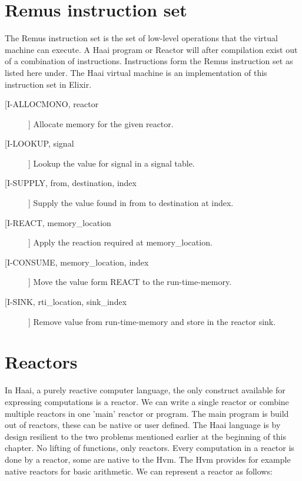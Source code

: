 \documentclass[a4paper]{book}
\begin{document}
\section{Remus instruction set}
The Remus instruction set is the set of low-level operations that the virtual machine can execute. A Haai program or Reactor will after compilation exist out of a combination of instructions. Instructions form the Remus instruction set as listed here under. The Haai virtual machine is an implementation of this instruction set in Elixir. 


\begin{description}
	\item[[I-ALLOCMONO, reactor]] Allocate memory for the given reactor.
	\item[[I-LOOKUP, signal]] Lookup the value for signal in a signal table.
	\item[[I-SUPPLY, from, destination, index]] Supply the value found in from to destination at index.
	\item[[I-REACT, memory\_location]] Apply the reaction required at memory\_location.
	\item[[I-CONSUME, memory\_location, index]] Move the value form REACT to the run-time-memory.
	\item[[I-SINK, rti\_location, sink\_index]] Remove value from run-time-memory and store in the reactor sink.
\end{description}

\section{Reactors}
In Haai, a purely reactive computer language, the only construct available for expressing computations is a reactor. We can write a single reactor or combine multiple reactors in one 'main' reactor or program. The main program is build out of reactors, these can be native or user defined. The Haai language is by design resilient to the two problems mentioned earlier at the beginning of this chapter. No lifting of functions, only reactors. Every computation in a reactor is done by a reactor, some are native to the Hvm. The Hvm provides for example native reactors for basic arithmetic. We can represent a reactor as follows:
\end{document}
